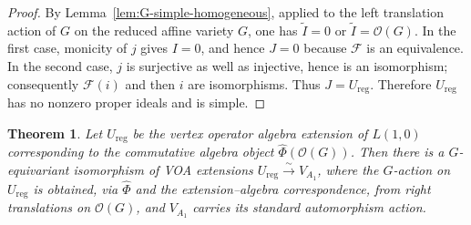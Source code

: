 \documentclass[12pt,leqno]{amsart}
\numberwithin{equation}{section} \newtheorem{thm}{Theorem}[section] \newtheorem{lem}[thm]{Lemma} \newtheorem{ex}[thm]{Example} \newtheorem{prop}[thm]{Proposition} \newtheorem{cor}[thm]{Corollary} \newtheorem{defi}[thm]{Definition} \newtheorem{rmk}[thm]{Remark} \newtheorem{notation}[thm]{Notation}
\newcommand{\OO}{\mathcal O}
\begin{document}
\begin{proof}
By Lemma~\ref{lem:G-simple-homogeneous}, applied to the left translation action of $G$ on the reduced affine variety $G$, one has \(\widetilde I=0\) or \(\widetilde I=\OO(G)\). In the first case, monicity of $j$ gives $I=0$, and hence $J=0$ because $\mathcal F$ is an equivalence. In the second case, $j$ is surjective as well as injective, hence is an isomorphism; consequently $\mathcal F(i)$ and then $i$ are isomorphisms. Thus $J=U_{\mathrm{reg}}$. Therefore $U_{\mathrm{reg}}$ has no nonzero proper ideals and is simple.
\end{proof}

\begin{thm}\label{thm:regular-algebra}
Let $U_{\mathrm{reg}}$ be the vertex operator algebra extension of $L(1,0)$ corresponding to the commutative algebra object $\widehat\Phi(\OO(G))$. Then there is a $G$-equivariant isomorphism of VOA extensions \(U_{\mathrm{reg}}\overset\sim\longrightarrow V_{A_1}\), where the $G$-action on $U_{\mathrm{reg}}$ is obtained, via $\widehat\Phi$ and the extension--algebra correspondence, from right translations on $\OO(G)$, and $V_{A_1}$ carries its standard automorphism action.
\end{thm}
\end{document}
